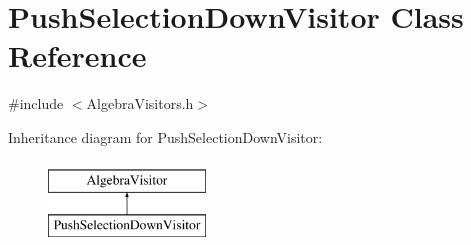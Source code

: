 \hypertarget{class_push_selection_down_visitor}{\section{Push\+Selection\+Down\+Visitor Class Reference}
\label{class_push_selection_down_visitor}
}


{\ttfamily \#include $<$Algebra\+Visitors.\+h$>$}

Inheritance diagram for Push\+Selection\+Down\+Visitor\+:\begin{figure}[H]
\begin{center}
\leavevmode
\includegraphics[height=2.000000cm]{class_push_selection_down_visitor}
\end{center}
\end{figure}
